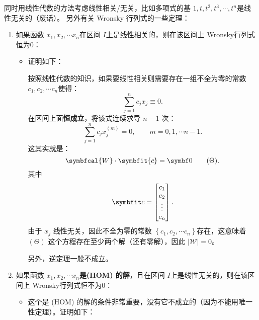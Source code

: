 \documentclass{ctexart}
\begin{document}
同时用线性代数的方法考虑线性相关/无关，比如多项式的基 \(1,t,t^2 ,t^3 ,\cdots ,t^{n}\)是线性无关的（废话）。
另外有关 Wronsky 行列式的一些定理：
\begin{enumerate}
    \item 如果函数 \(x_1,x_2,\cdots x_n\)在区间 \(I\)上是线性相关的，则在该区间上 Wronsky行列式恒为0：
    \begin{itemize}
        \item 证明如下：

        按照线性代数的知识，如果要线性相关则需要存在一组不全为零的常数 \(c_1,c_2,\cdots c_n\)使得：
        \[
        \sum\limits_{j=1}^{n} c_j x_j\equiv 0
        .\]
        在区间上面\textbf{恒成立}，将该式连续求导 \(n-1\) 次：
        \[
            \sum\limits_{j=1}^{n} c_j x_j^{(m)}=0,\qquad m=0,1,\cdots n-1
        .\]
        这其实就是：
        \[
       \symbfcal{W}\cdot \symbfit{c}  = \symbf 0 \tag{\(\Theta \)}
        .\]
        其中 
        \[
        \symbfit c=\begin{bmatrix}
            c_1 \\    c_2 \\    \vdots \\    c_n \\\end{bmatrix}
        .\]
        由于 \(x_j\) 线性无关，因此不全为零的常数 \(\left\{ c_1,c_2,\cdots c_n \right\} \)存在，这意味着 \((\Theta )\) 这个方程存在至少两个解（还有零解），因此 \( \left\vert\mathcal{W}  \right\vert=0  \)。
        
        另外，逆定理一般不成立。
    \end{itemize}
    \item  如果函数 \(x_1,x_2,\cdots x_n\)\textbf{是(HOM) 的解}，且在区间 \(I\)上是线性无关的，则在该区间上 Wronsky行列式恒不为0：
    \begin{itemize}
        \item 这个是 (HOM) 的解的条件非常重要，没有它不成立的（因为不能用唯一性定理）。证明如下：
        

\end{itemize}
\end{enumerate}
\end{document}
